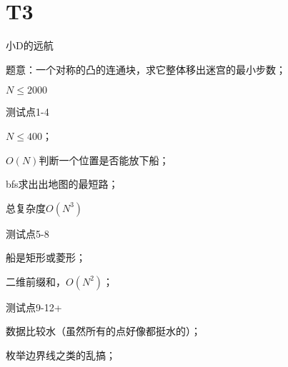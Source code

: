\documentclass{beamer}
\begin{document}
\section{T3}
\begin{frame}{小D的远航}

	\par 题意：一个对称的凸的连通块，求它整体移出迷宫的最小步数；

	\par $N \leq 2000$

\end{frame}

\begin{frame}{测试点1-4}

	\par $N \leq 400$；

	\pause

	\par $O(N)$判断一个位置是否能放下船；

	\pause

	\par bfs求出出地图的最短路；

	\par 总复杂度$O(N^3)$

\end{frame}

\begin{frame}{测试点5-8}

	\par 船是矩形或菱形；

	\pause

	\par 二维前缀和，$O(N^2)$；

\end{frame}

\begin{frame}{测试点9-12+}

	\par 数据比较水（虽然所有的点好像都挺水的）；

	\pause

	\par 枚举边界线之类的乱搞；

\end{frame}
\end{document}
